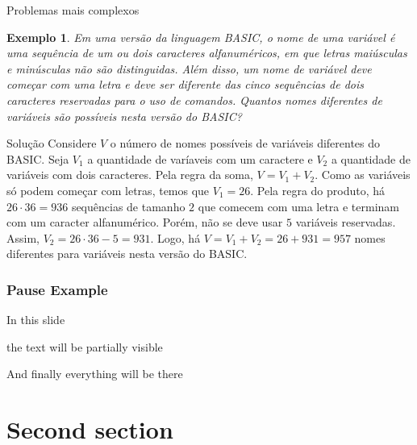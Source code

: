 \documentclass[aspectratio=169,t]{beamer}
\newtheorem{ex}{Exemplo}
\begin{document}


 \begin{frame}{Problemas mais complexos}
\footnotesize
  \begin{ex}
Em uma versão da linguagem BASIC, o nome de uma variável é uma sequência de um ou dois caracteres alfanuméricos, em que letras maiúsculas e minúsculas não são distinguidas. Além disso, um nome de variável deve começar com uma letra e deve ser diferente das cinco sequências de dois caracteres reservadas para o uso de comandos. Quantos nomes diferentes de variáveis são possíveis nesta versão do BASIC?
  \end{ex}

\begin{block}{Solução}
Considere $V$ o número de nomes possíveis de variáveis diferentes do BASIC. Seja $V_1$ a quantidade de varíaveis com um caractere e $V_2$ a quantidade de variáveis com dois caracteres. Pela regra da soma, $V=V_1+V_2$. Como as variáveis só podem começar com letras, temos que $V_1=26$. Pela regra do produto, há $26\cdot 36=936$ sequências de tamanho $2$ que comecem com uma letra e terminam com um caracter alfanumérico. Porém, não se deve usar $5$ variáveis reservadas. Assim, $V_2=26\cdot 36-5=931$. Logo, há $V=V_1+V_2 = 26+931=957$ nomes diferentes para variáveis nesta versão do BASIC.
  \end{block}

 \end{frame}



\begin{frame}
\frametitle{Pause Example}
In this slide \pause

the text will be partially visible \pause

And finally everything will be there
\end{frame}



\section{Second section}
\end{document}
